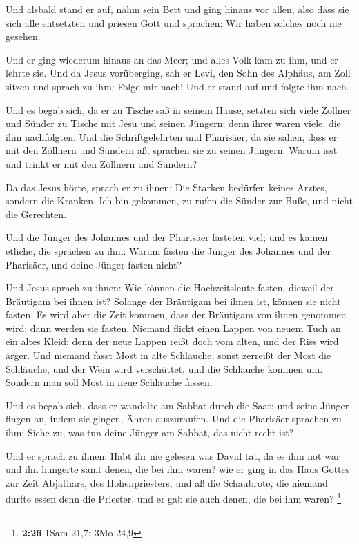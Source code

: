  Und alsbald stand er auf, nahm sein Bett und ging hinaus
vor allen, also dass sie sich alle entsetzten und priesen Gott und
sprachen: Wir haben solches noch nie gesehen.

 Und er ging wiederum hinaus an das Meer; und alles Volk
kam zu ihm, und er lehrte sie.  Und da Jesus vorüberging,
sah er Levi, den Sohn des Alphäus, am Zoll sitzen und sprach zu ihm:
Folge mir nach! Und er stand auf und folgte ihm nach.

 Und es begab sich, da er zu Tische saß in seinem Hause,
setzten sich viele Zöllner und Sünder zu Tische mit Jesu und seinen
Jüngern; denn ihrer waren viele, die ihm nachfolgten. 
Und die Schriftgelehrten und Pharisäer, da sie sahen, dass er mit den
Zöllnern und Sündern aß, sprachen sie zu seinen Jüngern: Warum isst und
trinkt er mit den Zöllnern und Sündern?

 Da das Jesus hörte, sprach er zu ihnen: Die Starken
bedürfen keines Arztes, sondern die Kranken. Ich bin gekommen, zu rufen
die Sünder zur Buße, und nicht die Gerechten.

 Und die Jünger des Johannes und der Pharisäer fasteten
viel; und es kamen etliche, die sprachen zu ihm: Warum fasten die Jünger
des Johannes und der Pharisäer, und deine Jünger fasten nicht?

 Und Jesus sprach zu ihnen: Wie können die Hochzeitsleute
fasten, dieweil der Bräutigam bei ihnen ist? Solange der Bräutigam bei
ihnen ist, können sie nicht fasten.  Es wird aber die
Zeit kommen, dass der Bräutigam von ihnen genommen wird; dann werden sie
fasten.  Niemand flickt einen Lappen von neuem Tuch an
ein altes Kleid; denn der neue Lappen reißt doch vom alten, und der Riss
wird ärger.  Und niemand fasst Most in alte Schläuche;
sonst zerreißt der Most die Schläuche, und der Wein wird verschüttet,
und die Schläuche kommen um. Sondern man soll Most in neue Schläuche
fassen.

 Und es begab sich, dass er wandelte am Sabbat durch die
Saat; und seine Jünger fingen an, indem sie gingen, Ähren auszuraufen.
 Und die Pharisäer sprachen zu ihm: Siehe zu, was tun
deine Jünger am Sabbat, das nicht recht ist?

 Und er sprach zu ihnen: Habt ihr nie gelesen was David
tat, da es ihm not war und ihn hungerte samt denen, die bei ihm waren?
 wie er ging in das Haus Gottes zur Zeit Abjathars, des
Hohenpriesters, und aß die Schaubrote, die niemand durfte essen denn die
Priester, und er gab sie auch denen, die bei ihm waren? \footnote{\textbf{2:26}
  1Sam 21,7; 3Mo 24,9}

